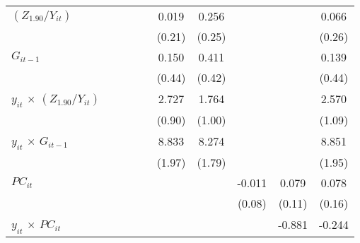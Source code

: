\documentclass[12pt, a4paper]{article}
\begin{document}
\begin{table}[htbp]
\begin{threeparttable}
{\begin{tabular}{l*{9}{c}}
				$(Z_{1.90}/Y_{it})$         &                     &                     &                     &                     &       0.019         &       0.256         &                     &                     &       0.066         \\
				&                     &                     &                     &                     &      (0.21)         &      (0.25)         &                     &                     &      (0.26)         \\
				$G_{it-1}$           &                     &                     &                     &                     &       0.150         &       0.411         &                     &                     &       0.139         \\
				&                     &                     &                     &                     &      (0.44)         &      (0.42)         &                     &                     &      (0.44)         \\
				$y_{it}$ $\times$ $(Z_{1.90}/Y_{it})$ &                     &                     &                     &                     &       2.727\sym{**} &       1.764         &                     &                     &       2.570\sym{*}  \\
				&                     &                     &                     &                     &      (0.90)         &      (1.00)         &                     &                     &      (1.09)         \\
				$y_{it}$ $\times$ $G_{it-1}$&                     &                     &                     &                     &       8.833\sym{***}&       8.274\sym{***}&                     &                     &       8.851\sym{***}\\
				&                     &                     &                     &                     &      (1.97)         &      (1.79)         &                     &                     &      (1.95)         \\
				$PC_{it}$                &                     &                     &                     &                     &                     &                     &      -0.011         &       0.079         &       0.078         \\
				&                     &                     &                     &                     &                     &                     &      (0.08)         &      (0.11)         &      (0.16)         \\
				$y_{it}$ $\times$ $PC_{it}$ &                     &                     &                     &                     &                     &                     &                     &      -0.881         &      -0.244         \\

\end{tabular}}
\end{threeparttable}
\end{table}
\end{document}
